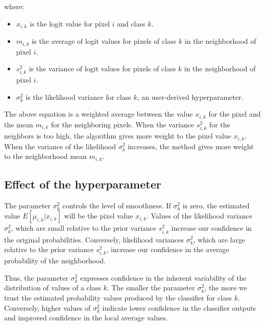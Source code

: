 \documentclass[
  shortnames]{jss}
\begin{document}
where:

\begin{itemize}
\item $x_{i,k}$ is the logit value for pixel $i$ and class $k$.
\item $m_{i,k}$ is the average of logit values for pixels of class $k$ 
in the neighborhood of pixel $i$.
\item $s^2_{i,k}$ is the variance of logit values for pixels of class $k$ 
in the neighborhood of pixel $i$.
\item $\sigma^2_{k}$ is the likelihood variance for class $k$, 
an user-derived hyperparameter.
\end{itemize}

The above equation is a weighted average between the value \(x_{i,k}\) for the pixel and the mean \(m_{i,k}\) for the neighboring pixels. When the variance \(s^2_{i,k}\) for the neighbors is too high, the algorithm gives more weight to the pixel value \(x_{i,k}\). When the variance of the likelihood \(\sigma^2_k\) increases, the method gives more weight to the neighborhood mean \(m_{i,k}\).

\hypertarget{effect-of-the-hyperparameter}{%
\subsection{Effect of the hyperparameter}\label{effect-of-the-hyperparameter}}

The parameter \(\sigma^2_k\) controls the level of smoothness. If \(\sigma^2_k\) is zero, the estimated value \({E}[\mu_{i,k} | x_{i,k}]\) will be the pixel value \(x_{i,k}\). Values of the likelihood variance \(\sigma^2_{k}\), which are small relative to the prior variance \(s^2_{i,k}\) increase our confidence in the original probabilities. Conversely, likelihood variances \(\sigma^2_{k}\), which are large relative to the prior variance \(s^2_{i,k}\), increase our confidence in the average probability of the neighborhood.

Thus, the parameter \(\sigma^2_{k}\) expresses confidence in the inherent variability of the distribution of values of a class \(k\). The smaller the parameter \(\sigma^2_{k}\), the more we trust the estimated probability values produced by the classifier for class \(k\).
Conversely, higher values of \(\sigma^2_{k}\) indicate lower confidence in the classifier outputs and improved confidence in the local average values.
\end{document}
